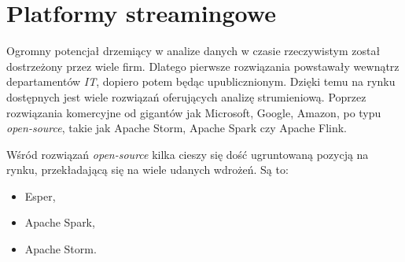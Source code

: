 \section{Platformy streamingowe}
Ogromny potencjał drzemiący w analize danych w czasie rzeczywistym został dostrzeżony przez wiele firm.
Dlatego pierwsze rozwiązania powstawały wewnątrz departamentów \textit{IT},
dopiero potem będąc upublicznionym.
Dzięki temu na rynku dostępnych jest wiele rozwiązań oferujących analizę strumieniową.
Poprzez rozwiązania komercyjne od gigantów jak Microsoft, Google, Amazon,
po typu \textit{open-source},
takie jak Apache Storm, Apache Spark czy Apache Flink.

Wśród rozwiązań \textit{open-source} kilka cieszy się dość ugruntowaną pozycją na rynku,
przekładającą się na wiele udanych wdrożeń.
Są to:
\begin{itemize}
	\item Esper,
	\item Apache Spark,
	\item Apache Storm.
\end{itemize}





